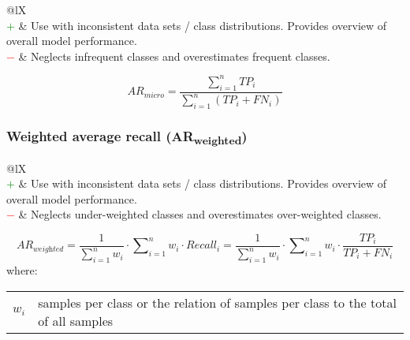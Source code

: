 \documentclass{article}
\makeatletter
\newenvironment{conditions}[1][where:]
    {\hspace{0.02\textwidth} #1 \begin{tabular}[t]{>{$}l<{$} @{${}={}$} l}}
    {\end{tabular}\\[\belowdisplayskip]}
\makeatother
\begin{document}
\begin{table}[H]\centering
    \begin{tabularx}{\textwidth}{@{}lX}
         \\
        \textcolor{Green}{$+$} & Use with inconsistent data sets / class distributions. Provides overview of overall model performance. \\
        \textcolor{Red}{$-$}   & Neglects infrequent classes and overestimates frequent classes.
    \end{tabularx}
\end{table}

\begin{equation}
    \textit{AR}_\textit{micro} = \dfrac{\sum\nolimits_{i = 1}^n \textit{TP}_i}{\sum\nolimits_{i = 1}^n (\textit{TP}_i + \textit{FN}_i)}
%
    \label{equation:MIAR}
\end{equation}


\subsubsection[Weighted average recall (ARweighted)]{Weighted average recall (AR\textsubscript{weighted}) \cite{gordon1988effect, han2014rule}}

\begin{table}[H]\centering
    \begin{tabularx}{\textwidth}{@{}lX}
         \\
        \textcolor{Green}{$+$} & Use with inconsistent data sets / class distributions. Provides overview of overall model performance. \\
        \textcolor{Red}{$-$}   & Neglects under-weighted classes and overestimates over-weighted classes.
    \end{tabularx}
\end{table}

\begin{equation}
    \textit{AR}_\textit{weighted} = \dfrac{1}{\sum\nolimits_{i = 1}^n w_i} \cdot \sum\nolimits_{i = 1}^n w_i \cdot \textit{Recall}_i = \dfrac{1}{\sum\nolimits_{i = 1}^n w_i} \cdot \sum\nolimits_{i = 1}^n w_i \cdot \dfrac{\textit{TP}_i}{\textit{TP}_i + \textit{FN}_i}
%
    \label{equation:WAR}
\end{equation}
%
\begin{conditions}
    w_i & samples per class or the relation of samples per class to the total of all samples
\end{conditions}
\end{document}
